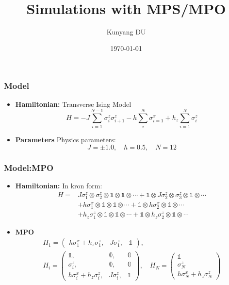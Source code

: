 \documentclass{beamer}
\title{Simulations with MPS/MPO}
\author{Kunyang DU}
\institute{Institue of Theoretical Physics}
\date{\today}
\begin{document}
\begin{frame}
	\titlepage
\end{frame}

\begin{frame}
	\frametitle{Model}
	\begin{itemize}
		\item \textbf{Hamiltonian:} Transverse Ising Model
		\begin{equation}
			H = -J\sum_{i=1}^{N-1}\sigma_i^z \sigma_{i+1}^z -h\sum_i^N\sigma_{i=1}^x + h_z\sum_{i=1}^N\sigma_i^z
		\end{equation}
		\item \textbf{Parameters} Physics parameters:
		\begin{equation}
			J = \pm 1.0,\quad h = 0.5,\quad N = 12
		\end{equation}
	\end{itemize}
\end{frame}

\begin{frame}
	\frametitle{Model:MPO}
	\begin{itemize}
		\item \textbf{Hamiltonian:} In kron form:
		\begin{equation}
			\begin{aligned}
				H = & J\sigma_1^z\otimes\sigma_2^z\otimes \mathbb{1}\otimes\mathbb{1}\otimes\cdots + \mathbb{1}\otimes J\sigma_2^z\otimes\sigma_3^z\otimes \mathbb{1}\otimes\cdots\\
				&+h\sigma_1^x\otimes\mathbb{1}\otimes\mathbb{1}\otimes\cdots + \mathbb{1}\otimes h\sigma_2^x\otimes\mathbb{1}\otimes\cdots \\
				& + h_z\sigma_1^z\otimes\mathbb{1}\otimes\mathbb{1}\otimes\cdots + \mathbb{1}\otimes h_z\sigma_2^z\otimes\mathbb{1}\otimes\cdots
			\end{aligned}
		\end{equation}
		\item \textbf{MPO} 
		\begin{equation}
			\begin{gathered}
				H_1 = \begin{pmatrix}
					h\sigma_1^x + h_z \sigma_1^z,& J\sigma_1^z,&\mathbb{1}
				\end{pmatrix},\\
				H_i = \begin{pmatrix}
					\mathbb{1},&\mathbb{0},&\mathbb{0}\\
					\sigma_i^z,&\mathbb{0},&\mathbb{0}\\
					h\sigma_i^x + h_z \sigma_i^z,& J\sigma_i^z,&\mathbb{1}
				\end{pmatrix},\quad 
				H_N = \begin{pmatrix}
					\mathbb{1}\\ \sigma_N^z\\h\sigma_N^x + h_z \sigma_N^z
				\end{pmatrix}
			\end{gathered}
		\end{equation}
	\end{itemize}
\end{frame}
\end{document}
